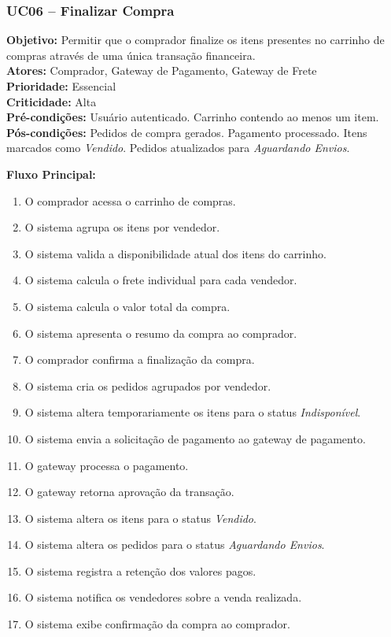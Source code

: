 ﻿\documentclass[12pt,a4paper]{article}
\begin{document}
\subsubsection{UC06 – Finalizar Compra}
\label{uc:04}
\noindent\textbf{Objetivo:} Permitir que o comprador finalize os itens presentes no carrinho de compras através de uma única transação financeira.\\
\textbf{Atores:} Comprador, Gateway de Pagamento, Gateway de Frete\\
\textbf{Prioridade:} Essencial\\
\textbf{Criticidade:} Alta\\
\textbf{Pré-condições:} Usuário autenticado. Carrinho contendo ao menos um item.\\
\textbf{Pós-condições:} Pedidos de compra gerados. Pagamento processado. Itens marcados como \textit{Vendido}. Pedidos atualizados para \textit{Aguardando Envios}.

\vspace{0.5em}
\noindent\textbf{Fluxo Principal:}
\begin{enumerate}[label=\arabic*.]
    \item O comprador acessa o carrinho de compras.
    \item O sistema agrupa os itens por vendedor.
    \item O sistema valida a disponibilidade atual dos itens do carrinho.
    \item O sistema calcula o frete individual para cada vendedor.
    \item O sistema calcula o valor total da compra.
    \item O sistema apresenta o resumo da compra ao comprador.
    \item O comprador confirma a finalização da compra.
    \item O sistema cria os pedidos agrupados por vendedor.
    \item O sistema altera temporariamente os itens para o status \textit{Indisponível}.
    \item O sistema envia a solicitação de pagamento ao gateway de pagamento.
    \item O gateway processa o pagamento.
    \item O gateway retorna aprovação da transação.
    \item O sistema altera os itens para o status \textit{Vendido}.
    \item O sistema altera os pedidos para o status \textit{Aguardando Envios}.
    \item O sistema registra a retenção dos valores pagos.
    \item O sistema notifica os vendedores sobre a venda realizada.
    \item O sistema exibe confirmação da compra ao comprador.
\end{enumerate}
\end{document}
